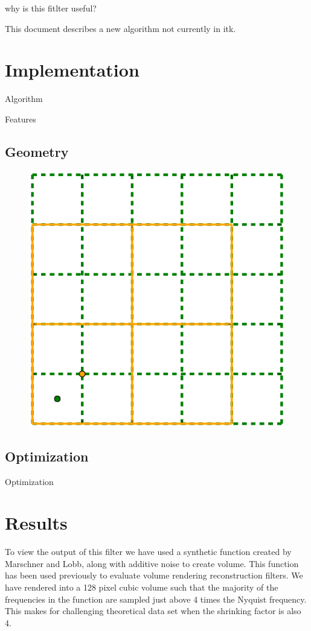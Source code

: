 \documentclass{InsightArticle}
\begin{document}
why is this fitlter useful?


This document describes a new algorithm not currently in
itk\cite{ITKSoftwareGuide}. 

\section{Implementation}

Algorithm

Features

\subsection{Geometry}


\begin{figure}
  \centering
  \includegraphics[width=0.8\linewidth]{images/pixelgrid}
  \label{fig:PixelGrid}
\end{figure}

\subsection{Optimization}
Optimization 


\section{Results}

To view the output of this filter we have used a synthetic function
created by Marschner and Lobb\cite{MarschnerL94}, along with additive
noise to create volume. This function has been used previously to
evaluate volume rendering reconstruction filters. We have rendered
into a 128 pixel cubic volume such that the majority of the frequencies in
the function are sampled just above 4 times the Nyquist frequency. This makes
for challenging theoretical data set when the shrinking factor is also
4.
\end{document}
